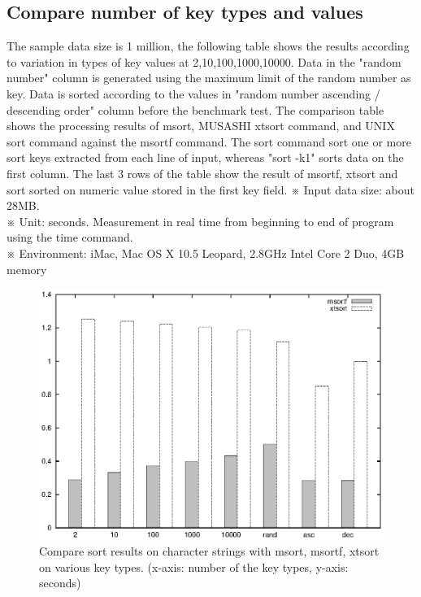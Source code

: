 \subsection*{Compare number of key types and values}
The sample data size is 1 million, the following table shows the results according to variation in types of key values at 2,10,100,1000,10000.
Data in the "random number" column is generated using the maximum limit of the random number as key. 
Data is sorted according to the values in "random number ascending / descending order" column before the benchmark test. 
The comparison table shows the processing results of msort, MUSASHI xtsort command, and UNIX sort command against the msortf command.
The sort command sort one or more sort keys extracted from each line of input, whereas "sort -k1" sorts data on the first column. 
The last 3 rows of the table show the result of  msortf, xtsort and sort sorted on numeric value stored in the first key field.
※ Input data size: about 28MB.\\
※ Unit: seconds. Measurement in real time from beginning to end of program using the time command. \\
※ Environment: iMac, Mac OS X 10.5 Leopard, 2.8GHz Intel Core 2 Duo, 4GB memory \\

%


\begin{figure}[hbt]
\begin{center}
\includegraphics[scale=.8]{figure/msortf/key.eps}
\end{center}
\vspace{10 mm}
\caption{Compare sort results on character strings with msort, msortf, xtsort on various key types. (x-axis: number of the key types, y-axis: seconds)\label{fig:msortf:bench1}}
\end{figure}

